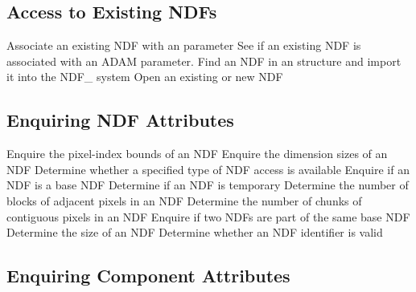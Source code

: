 \subsection{Access to Existing NDFs}

            {Associate an existing NDF with an  parameter}
            {See if an existing NDF is associated with an ADAM parameter.}
            {Find an NDF in an  structure and import it into the NDF\_ system}
            {Open an existing or new NDF}

\subsection{Enquiring NDF Attributes}

            {Enquire the pixel-index bounds of an NDF}
            {Enquire the dimension sizes of an NDF}
            {Determine whether a specified type of NDF access is available}
            {Enquire if an NDF is a base NDF}
            {Determine if an NDF is temporary}
            {Determine the number of blocks of adjacent pixels in an NDF}
            {Determine the number of chunks of contiguous pixels in an NDF}
            {Enquire if two NDFs are part of the same base NDF}
            {Determine the size of an NDF}
            {Determine whether an NDF identifier is valid}

\subsection{Enquiring Component Attributes}

